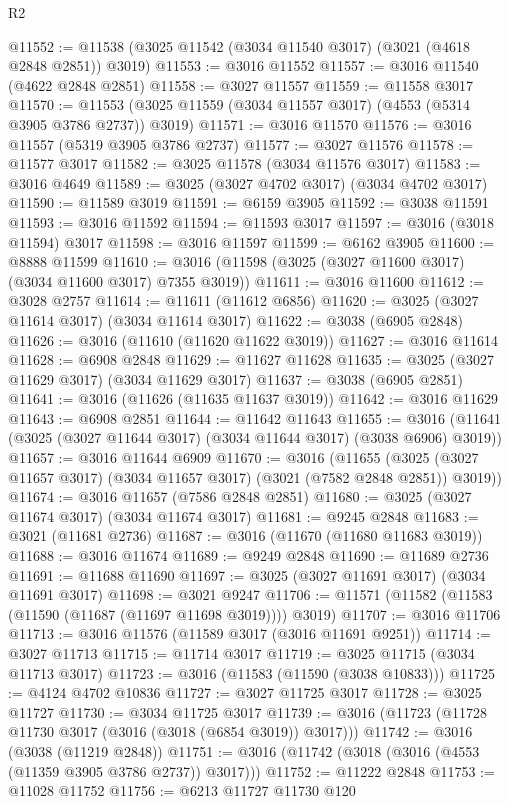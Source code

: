 \begin{lexlean}{R2}
\begin{coremodule}
@11552 := @11538 (@3025 @11542 (@3034 @11540 @3017) (@3021 (@4618 @2848 @2851)) @3019)
@11553 := @3016 @11552
@11557 := @3016 @11540 (@4622 @2848 @2851)
@11558 := @3027 @11557
@11559 := @11558 @3017
@11570 := @11553 (@3025 @11559 (@3034 @11557 @3017) (@4553 (@5314 @3905 @3786 @2737)) @3019)
@11571 := @3016 @11570
@11576 := @3016 @11557 (@5319 @3905 @3786 @2737)
@11577 := @3027 @11576
@11578 := @11577 @3017
@11582 := @3025 @11578 (@3034 @11576 @3017)
@11583 := @3016 @4649
@11589 := @3025 (@3027 @4702 @3017) (@3034 @4702 @3017)
@11590 := @11589 @3019
@11591 := @6159 @3905
@11592 := @3038 @11591
@11593 := @3016 @11592
@11594 := @11593 @3017
@11597 := @3016 (@3018 @11594) @3017
@11598 := @3016 @11597
@11599 := @6162 @3905
@11600 := @8888 @11599
@11610 := @3016 (@11598 (@3025 (@3027 @11600 @3017) (@3034 @11600 @3017) @7355 @3019))
@11611 := @3016 @11600
@11612 := @3028 @2757
@11614 := @11611 (@11612 @6856)
@11620 := @3025 (@3027 @11614 @3017) (@3034 @11614 @3017)
@11622 := @3038 (@6905 @2848)
@11626 := @3016 (@11610 (@11620 @11622 @3019))
@11627 := @3016 @11614
@11628 := @6908 @2848
@11629 := @11627 @11628
@11635 := @3025 (@3027 @11629 @3017) (@3034 @11629 @3017)
@11637 := @3038 (@6905 @2851)
@11641 := @3016 (@11626 (@11635 @11637 @3019))
@11642 := @3016 @11629
@11643 := @6908 @2851
@11644 := @11642 @11643
@11655 := @3016 (@11641 (@3025 (@3027 @11644 @3017) (@3034 @11644 @3017) (@3038 @6906) @3019))
@11657 := @3016 @11644 @6909
@11670 := @3016
    (@11655 (@3025 (@3027 @11657 @3017) (@3034 @11657 @3017) (@3021 (@7582 @2848 @2851)) @3019))
@11674 := @3016 @11657 (@7586 @2848 @2851)
@11680 := @3025 (@3027 @11674 @3017) (@3034 @11674 @3017)
@11681 := @9245 @2848
@11683 := @3021 (@11681 @2736)
@11687 := @3016 (@11670 (@11680 @11683 @3019))
@11688 := @3016 @11674
@11689 := @9249 @2848
@11690 := @11689 @2736
@11691 := @11688 @11690
@11697 := @3025 (@3027 @11691 @3017) (@3034 @11691 @3017)
@11698 := @3021 @9247
@11706 := @11571 (@11582 (@11583 (@11590 (@11687 (@11697 @11698 @3019)))) @3019)
@11707 := @3016 @11706
@11713 := @3016 @11576 (@11589 @3017 (@3016 @11691 @9251))
@11714 := @3027 @11713
@11715 := @11714 @3017
@11719 := @3025 @11715 (@3034 @11713 @3017)
@11723 := @3016 (@11583 (@11590 (@3038 @10833)))
@11725 := @4124 @4702 @10836
@11727 := @3027 @11725 @3017
@11728 := @3025 @11727
@11730 := @3034 @11725 @3017
@11739 := @3016 (@11723 (@11728 @11730 @3017 (@3016 (@3018 (@6854 @3019)) @3017)))
@11742 := @3016 (@3038 (@11219 @2848))
@11751 := @3016 (@11742 (@3018 (@3016 (@4553 (@11359 @3905 @3786 @2737)) @3017)))
@11752 := @11222 @2848
@11753 := @11028 @11752
@11756 := @6213 @11727 @11730 @120

\end{coremodule}
\end{lexlean}
